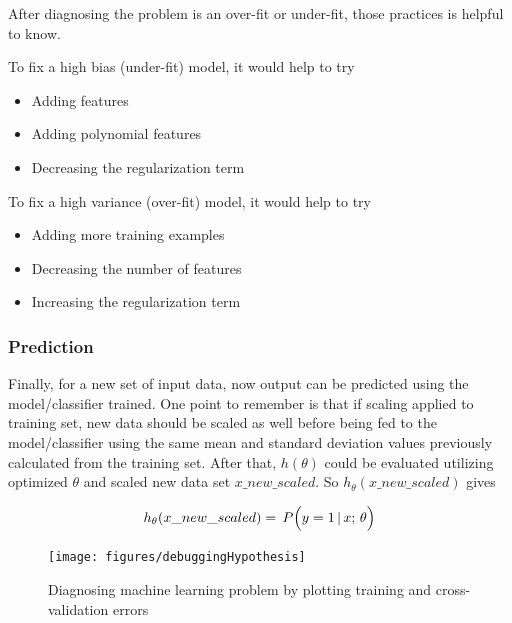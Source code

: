 After diagnosing the problem is an over-fit or under-fit, those practices is helpful to know. 

To fix a high bias (under-fit) model, it would help to try 

\begin{itemize}

\item{Adding features}
\item{Adding polynomial features}
\item{Decreasing the regularization term}

\end{itemize}

To fix a high variance (over-fit) model, it would help to try 

\begin{itemize}

\item{Adding more training examples}
\item{Decreasing the number of features}
\item{Increasing the regularization term}

\end{itemize}

\subsubsection{Prediction}

Finally, for a new set of input data, now output can be predicted using the model/classifier trained. 
One point to remember is that if scaling applied to training set, new data should be scaled as well before being fed to the model/classifier using the same mean and standard deviation values previously calculated from the training set. 
After that, $h(\theta)$ could be evaluated utilizing optimized $\theta$ and scaled new data set $x\_new\_scaled$. 
So $h_\theta(x\_new\_scaled)$ gives

\begin{equation}{\label{eqn:prediction}
h_{\theta}(x\_new\_scaled})
=\,
P\Big(y=1 \, | \, x; \, \theta \Big)
\end{equation} 

\begin{landscape}
\begin{figure}
\begin{center}
\texttt{[image: figures/debuggingHypothesis]}    %
\caption{Diagnosing machine learning problem by plotting training and cross-validation errors} 
\label{fig:debuggingHypothesis}
\end{center}
\end{figure}
\end{landscape}

